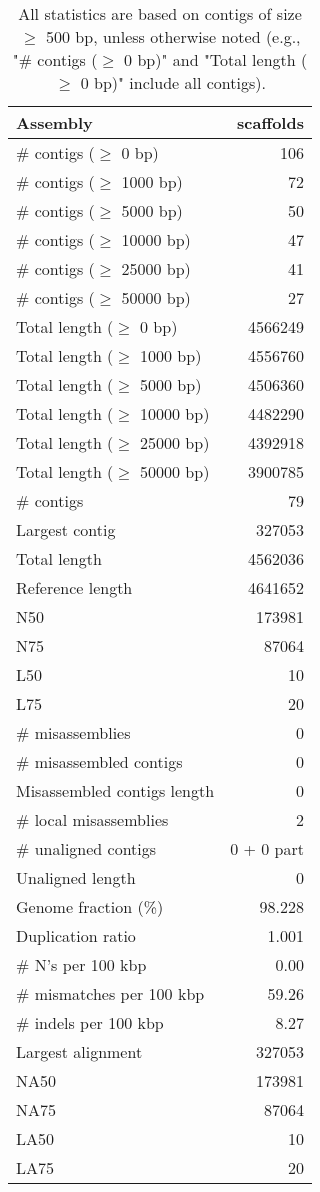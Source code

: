 \documentclass[12pt,a4paper]{article}
\begin{document}
\begin{table}[ht]
\begin{center}
\caption{All statistics are based on contigs of size $\geq$ 500 bp, unless otherwise noted (e.g., "\# contigs ($\geq$ 0 bp)" and "Total length ($\geq$ 0 bp)" include all contigs).}
\begin{tabular}{|l*{1}{|r}|}
\hline
Assembly & scaffolds \\ \hline
\# contigs ($\geq$ 0 bp) & 106 \\ \hline
\# contigs ($\geq$ 1000 bp) & 72 \\ \hline
\# contigs ($\geq$ 5000 bp) & 50 \\ \hline
\# contigs ($\geq$ 10000 bp) & 47 \\ \hline
\# contigs ($\geq$ 25000 bp) & 41 \\ \hline
\# contigs ($\geq$ 50000 bp) & 27 \\ \hline
Total length ($\geq$ 0 bp) & 4566249 \\ \hline
Total length ($\geq$ 1000 bp) & 4556760 \\ \hline
Total length ($\geq$ 5000 bp) & 4506360 \\ \hline
Total length ($\geq$ 10000 bp) & 4482290 \\ \hline
Total length ($\geq$ 25000 bp) & 4392918 \\ \hline
Total length ($\geq$ 50000 bp) & 3900785 \\ \hline
\# contigs & 79 \\ \hline
Largest contig & 327053 \\ \hline
Total length & 4562036 \\ \hline
Reference length & 4641652 \\ \hline
N50 & 173981 \\ \hline
N75 & 87064 \\ \hline
L50 & 10 \\ \hline
L75 & 20 \\ \hline
\# misassemblies & 0 \\ \hline
\# misassembled contigs & 0 \\ \hline
Misassembled contigs length & 0 \\ \hline
\# local misassemblies & 2 \\ \hline
\# unaligned contigs & 0 + 0 part \\ \hline
Unaligned length & 0 \\ \hline
Genome fraction (\%) & 98.228 \\ \hline
Duplication ratio & 1.001 \\ \hline
\# N's per 100 kbp & 0.00 \\ \hline
\# mismatches per 100 kbp & 59.26 \\ \hline
\# indels per 100 kbp & 8.27 \\ \hline
Largest alignment & 327053 \\ \hline
NA50 & 173981 \\ \hline
NA75 & 87064 \\ \hline
LA50 & 10 \\ \hline
LA75 & 20 \\ \hline
\end{tabular}
\end{center}
\end{table}
\end{document}
